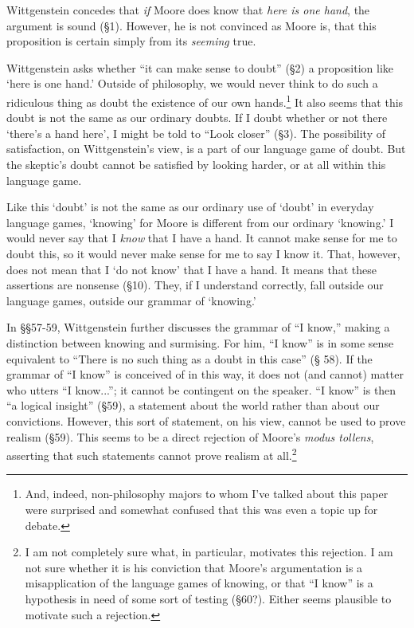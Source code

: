 \documentclass[man,12pt,natbib]{apa6}
\begin{document}
Wittgenstein concedes that \emph{if} Moore does know that \emph{here is one
hand}, the argument is sound (\S 1). However, he is not convinced as Moore is,
that this proposition is certain simply from its \emph{seeming} true.

Wittgenstein asks whether ``it can make sense to doubt'' (\S 2) a proposition
like `here is one hand.' Outside of philosophy, we would never think to do such
a ridiculous thing as doubt the existence of our own hands.\footnote{And,
indeed, non-philosophy majors to whom I've talked about this paper were
surprised and somewhat confused that this was even a topic up for debate.}
It also seems that this doubt is not the same as our ordinary doubts. If I
doubt whether or not there `there's a hand here', I might be told to ``Look
closer'' (\S 3). The possibility of satisfaction, on Wittgenstein's view, is a
part of our language game of doubt. But the skeptic's doubt cannot be satisfied
by looking harder, or at all within this language game.

Like this `doubt' is not the same as our ordinary use of `doubt' in everyday
language games, `knowing' for Moore is different from our ordinary `knowing.' I
would never say that I \emph{know} that I have a hand. It cannot make sense for
me to doubt this, so it would never make sense for me to say I know it. That,
however, does not mean that I `do not know' that I have a hand. It means that
these assertions are nonsense (\S 10). They, if I understand correctly, fall
outside our language games, outside our grammar of `knowing.'

In \S\S 57-59, Wittgenstein further discusses the grammar of ``I know,''
making a distinction between knowing and surmising. For him, ``I know'' is in
some sense equivalent to ``There is no such thing as a doubt in this case'' (\S
58). If the grammar of ``I know'' is conceived of in this way, it does not (and
cannot) matter who utters ``I know...''; it cannot be contingent on the
speaker. ``I know'' is then ``a logical insight'' (\S 59), a statement about
the world rather than about our convictions. However, this sort of statement,
on his view, cannot be used to prove realism (\S 59).  This seems to be a
direct rejection of Moore's \emph{modus tollens}, asserting that such
statements cannot prove realism at all.\footnote{I am not completely sure what,
in particular, motivates this rejection. I am not sure whether it is his
conviction that Moore's argumentation is a misapplication of the language games
of knowing, or that ``I know'' is a hypothesis in need of some sort of testing
(\S 60?). Either seems plausible to motivate such a rejection.}
\end{document}
